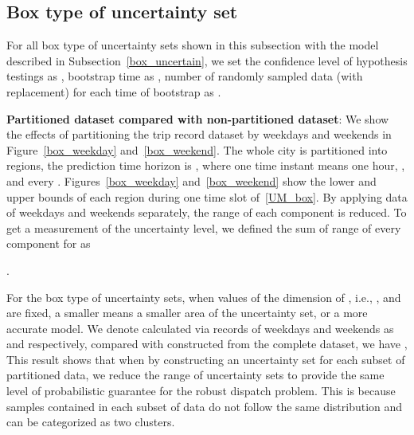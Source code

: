 \documentclass[10pt,twocolumn,twoside,english]{IEEEtran}
\begin{document}
\subsection{Box type of uncertainty set}
For all box type of uncertainty sets shown in this subsection with the model described in Subsection~\ref{box_uncertain}, we set the confidence level of hypothesis testings as , bootstrap time as , number of randomly sampled data (with replacement) for each time of bootstrap as .

\textbf{Partitioned dataset compared with non-partitioned dataset}:
We show the effects of partitioning the trip record dataset by weekdays and weekends in Figure~\ref{box_weekday} and~\ref{box_weekend}. The whole city is partitioned into  regions, the prediction time horizon is , where one time instant means one hour, , and every .  Figures~\ref{box_weekday} and~\ref{box_weekend} show the lower and upper bounds of each region during one time slot of~\eqref{UM_box}.  By applying data of weekdays and weekends separately, the range  of each component is reduced. To get a measurement of the uncertainty level, we defined the sum of range of every component for   as\\
\centerline{.}
For the box type of uncertainty sets, when values of the dimension of , i.e., ,  and  are fixed, a smaller  means a smaller area of the uncertainty set, or a more accurate model. We denote  calculated via records of weekdays and weekends as  and  respectively, compared with  constructed from the complete dataset, we have ,  This result shows that when by constructing an uncertainty set for each subset of partitioned data, we reduce the range of uncertainty sets to provide the same level of probabilistic guarantee for the robust dispatch problem. This is because samples contained in each subset of data do not follow the same distribution and can be categorized as two clusters. 
\end{document}
